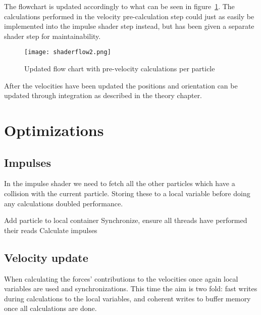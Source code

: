 The flowchart is updated accordingly to what can be seen in figure~\ref{fig:shaderflow2}.
The calculations performed in the velocity pre-calculation step could just as easily
be implemented into the impulse shader step instead, but has been given a separate shader
step for maintainability.

\begin{figure}[H]
  \centering
  \texttt{[image: shaderflow2.png]}
  \caption{Updated flow chart with pre-velocity calculations per particle}
  \label{fig:shaderflow2}
\end{figure}


After the velocities have been updated the positions and orientation can be
updated through integration as described in the theory chapter.

\section{Optimizations}
\subsection{Impulses}
In the impulse shader we need to fetch all the other particles which have a collision
with the current particle. Storing these to a local variable before doing any
calculations doubled performance.

\begin{algorithm}[H]
  \begin{algorithmic}[1]
    Add particle to local container
  \EndFor
  \State Synchronize, ensure all threads have performed their reads
  \State Calculate impulses
\end{algorithmic}
\end{algorithm}

\subsection{Velocity update}
When calculating the forces' contributions to the velocities once again local variables
are used and synchronizations. This time the aim is two fold: fast writes during
calculations to the local variables, and coherent writes to buffer memory once all
calculations are done.
